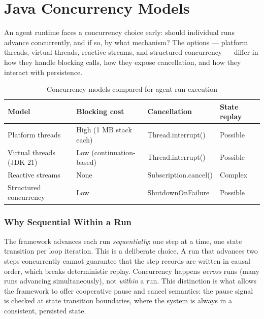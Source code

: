 \section{Java Concurrency Models}
\label{sec:java-concurrency-models}

An agent runtime faces a concurrency choice early: should individual runs advance
concurrently, and if so, by what mechanism?
The options — platform threads, virtual threads, reactive streams, and structured
concurrency — differ in how they handle blocking calls, how they expose cancellation,
and how they interact with persistence.

\begin{table}[htbp]
\centering
\caption{Concurrency models compared for agent run execution}
\label{tab:concurrency-models}
\begin{tabular}{llll}
\toprule
\textbf{Model} & \textbf{Blocking cost} & \textbf{Cancellation} & \textbf{State replay} \\
\midrule
Platform threads        & High (1 MB stack each)  & Thread.interrupt()    & Possible \\
Virtual threads (JDK 21)& Low (continuation-based)& Thread.interrupt()    & Possible \\
Reactive streams        & None                    & Subscription.cancel() & Complex  \\
Structured concurrency  & Low                     & ShutdownOnFailure     & Possible \\
\bottomrule
\end{tabular}
\end{table}

\subsubsection{Why Sequential Within a Run}
\label{subsec:why-sequential}

The framework advances each run \emph{sequentially}: one step at a time, one state
transition per loop iteration.
This is a deliberate choice.
A run that advances two steps concurrently cannot guarantee that the step records
are written in causal order, which breaks deterministic replay.
Concurrency happens \emph{across} runs (many runs advancing simultaneously), not
\emph{within} a run.
This distinction is what allows the framework to offer cooperative pause and cancel
semantics: the pause signal is checked at state transition boundaries, where the
system is always in a consistent, persisted state.

